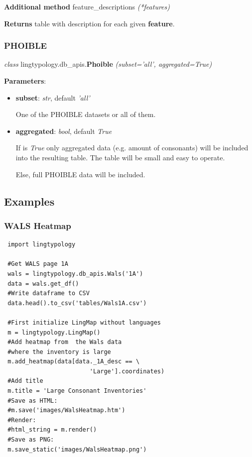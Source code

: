 \documentclass[a4paper,12pt]{article}
\begin{document}
\textbf{Additional method} feature\_descriptions \textit{(*features)}

\textbf{Returns} table with description for each given \textbf{feature}.

\subsubsection{PHOIBLE}

\textit{class} lingtypology.db\_apis.\textbf{Phoible} \textit{(subset='all', aggregated=True)}
\medskip

\textbf{Parameters}:
\begin{itemize}
 \item \textbf{subset}: \textit{str}, default \textit{'all'}
 
 One of the PHOIBLE datasets or all of them.
 \item \textbf{aggregated}: \textit{bool}, default \textit{True}
 
 If is \textit{True} only aggregated data (e.g. amount of consonants) will be included into the resulting table. The table will be small and easy to operate.
 
 Else, full PHOIBLE data will be included.
\end{itemize}


\subsection{Examples}

\subsubsection{WALS Heatmap}

\noindent
\begin{minipage}{\textwidth}
\begin{lstlisting}
 import lingtypology

 #Get WALS page 1A
 wals = lingtypology.db_apis.Wals('1A')
 data = wals.get_df()
 #Write dataframe to CSV
 data.head().to_csv('tables/Wals1A.csv')
 
 #First initialize LingMap without languages
 m = lingtypology.LingMap()
 #Add heatmap from  the Wals data
 #where the inventory is large
 m.add_heatmap(data[data._1A_desc == \
                        'Large'].coordinates)
 #Add title
 m.title = 'Large Consonant Inventories'
 #Save as HTML:
 #m.save('images/WalsHeatmap.htm')
 #Render:
 #html_string = m.render()
 #Save as PNG:
 m.save_static('images/WalsHeatmap.png')
\end{lstlisting}
\end{minipage}
\end{document}
